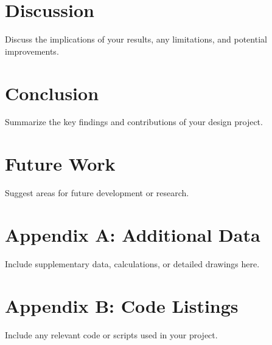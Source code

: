 \documentclass[draft]{../designreport}
\begin{document}
\section{Discussion}

Discuss the implications of your results, any limitations, and potential improvements.

\section{Conclusion}

Summarize the key findings and contributions of your design project.

\section{Future Work}

Suggest areas for future development or research.

\printbibliography

\appendix
\section{Appendix A: Additional Data}

Include supplementary data, calculations, or detailed drawings here.

\section{Appendix B: Code Listings}

Include any relevant code or scripts used in your project.
\end{document}
